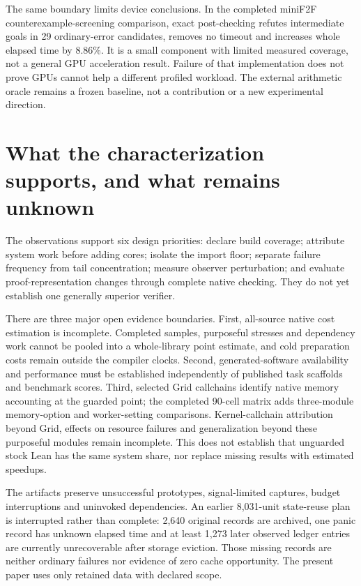 \documentclass[10pt,twocolumn]{article}
\begin{document}
The same boundary limits device conclusions.
In the completed miniF2F counterexample-screening comparison, exact
post-checking refutes intermediate goals in 29 ordinary-error candidates,
removes no timeout and increases whole elapsed time by 8.86\%.
It is a small component with limited measured coverage, not a general GPU
acceleration result. Failure of that implementation does not prove GPUs
cannot help a different profiled workload.
The external arithmetic oracle remains a frozen baseline, not a contribution
or a new experimental direction.

\section{What the characterization supports, and what remains unknown}
\label{sec:limits}
The observations support six design priorities: declare build coverage;
attribute system work before adding cores; isolate the import floor;
separate failure frequency from tail concentration; measure observer
perturbation; and evaluate proof-representation changes through complete
native checking. They do not yet establish one generally superior verifier.

There are three major open evidence boundaries.
First, all-source native cost estimation is incomplete. Completed samples,
purposeful stresses and dependency work cannot be pooled into a whole-library
point estimate, and cold preparation costs remain outside the compiler
clocks. Second, generated-software availability and performance must be
established independently of published task scaffolds and benchmark scores.
Third, selected Grid callchains identify native memory accounting
at the guarded point; the completed 90-cell matrix adds three-module
memory-option and worker-setting comparisons.
Kernel-callchain attribution beyond Grid, effects on resource failures and
generalization beyond these purposeful modules remain incomplete. This does not establish that unguarded stock Lean has
the same system share, nor replace missing results with estimated speedups.

The artifacts preserve unsuccessful prototypes, signal-limited captures,
budget interruptions and uninvoked dependencies.
An earlier 8,031-unit state-reuse plan is interrupted rather than complete:
2,640 original records are archived, one panic record has unknown elapsed
time and at least 1,273 later observed ledger entries are currently
unrecoverable after storage eviction.
Those missing records are neither ordinary failures nor evidence of zero
cache opportunity. The present paper uses only retained data with declared
scope.
\end{document}
